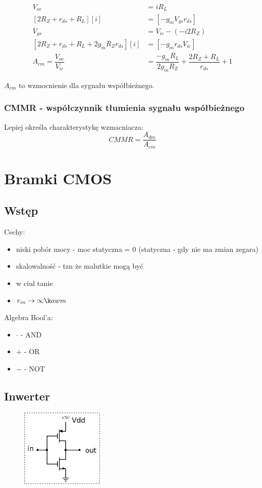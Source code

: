 \documentclass[10pt,a4paper]{article}
\begin{document}
\begin{align*}
V_{oc}&=i R_L \\
[2R_{Z}+r_{ds}+R_L][i]&=[-g_{m}V_{gs}r_{ds}] \\
V_{gs}&=V_{ic}-(-i2R_{Z}) \\
[2R_{Z}+r_{ds}+R_L+2g_{m}R_{Z}r_{ds}][i]&=[-g_{m}r_{ds}V_{ic}]\\
A_{cm}=\dfrac{V_{oc}}{V_{ic}}&=\dfrac{-g_{m}R_L}{2g_{m}R_{Z}}+\dfrac{2R_{Z}+R_{L}}{r_{ds}}+1
\end{align*}

$A_{cm}$ to wzmocnienie dla sygnału współbieżnego.

\subsubsection{CMMR - współczynnik tłumienia sygnału współbieżnego}
Lepiej określa charakterystykę wzmacniacza:
\begin{equation}
CMMR=\dfrac{A_{dm}}{A_{cm}}
\end{equation}

\section{Bramki CMOS}
\subsection{Wstęp}
Cechy:
\begin{itemize}
\item niski pobór mocy - moc statyczna = 0 (statyczna - gdy nie ma zmian zegara)
\item skalowalność  - tzn że malutkie mogą być
\item w ciul tanie
\item $r_{in} \rightarrow \inftyą w m$ 
\end{itemize}

Algebra Bool'a:
\begin{itemize}
\item $\cdot$ - AND
\item  $+$ - OR
\item $-$ - NOT
\end{itemize}



\subsection{Inwerter}
\begin{figure}[H]
\centering
\includegraphics[width=0.35\textwidth]{NOT.png}
\end{figure}
\end{document}
